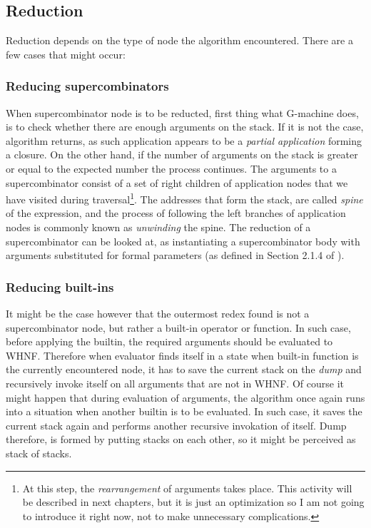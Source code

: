 \documentclass[12pt,a4paper]{report}
\begin{document}
\subsection{Reduction}
Reduction depends on the type of node the algorithm encountered. There are a
few cases that might occur:

\subsubsection{Reducing supercombinators}
When supercombinator node is to be reducted, first thing what G-machine does,
is to check whether there are enough arguments on the stack. If it is not the
case, algorithm returns, as such application appears to be a \textit{partial
application} forming a closure. On the other hand, if the number of arguments
on the stack is greater or equal to the expected number the process continues.
The arguments to a supercombinator consist of a set of right children of
application nodes that we have visited during traversal\footnote{At this step,
the \textit{rearrangement} of arguments takes place. This activity will be
described in next chapters, but it is just an optimization so I am not going to
introduce it right now, not to make unnecessary complications.}. The addresses
that form the stack, are called \textit{spine} of the expression, and the
process of following the left branches of application nodes is commonly known
as \textit{unwinding} the spine. The reduction of a supercombinator can be
looked at, as instantiating a supercombinator body with arguments substituted
for formal parameters (as defined in Section 2.1.4 of \cite{JonLes00}).

\subsubsection{Reducing built-ins}
It might be the case however that the outermost redex found is not a
supercombinator node, but rather a built-in operator or function. In such case,
before applying the builtin, the required arguments should be evaluated to
WHNF. Therefore when evaluator finds itself in a state when built-in function
is the currently encountered node, it has to save the current stack on the
\textit{dump} and recursively invoke itself on all arguments that are not in
WHNF. Of course it might happen that during evaluation of arguments, the
algorithm once again runs into a situation when another builtin is to be
evaluated. In such case, it saves the current stack again and performs another
recursive invokation of itself. Dump therefore, is formed by putting stacks on
each other, so it might be perceived as stack of stacks.
\end{document}
